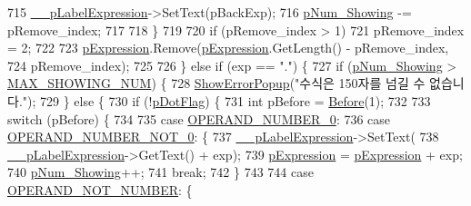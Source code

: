 \begin{DoxyCode}
715                 \hyperlink{class_calculator_form_a85c791f34a8b69e7d22b7d64d7f69bac}{\_\_pLabelExpression}->SetText(pBackExp);
716                 \hyperlink{_calculator_form_8cpp_afab1dc0f42edf6d2d70e1a3b9a23114b}{pNum\_Showing} -= pRemove\_index;
717 
718             \}
719 
720             \textcolor{keywordflow}{if} (pRemove\_index > 1)
721                 pRemove\_index = 2;
722 
723             \hyperlink{_calculator_form_8cpp_a8e641e0c730e6831fcb8e9caf57f5285}{pExpression}.Remove(\hyperlink{_calculator_form_8cpp_a8e641e0c730e6831fcb8e9caf57f5285}{pExpression}.GetLength() - pRemove\_index,
724                     pRemove\_index);
725 
726         \} \textcolor{keywordflow}{else} \textcolor{keywordflow}{if} (exp == \textcolor{stringliteral}{"."}) \{
727             \textcolor{keywordflow}{if} (\hyperlink{_calculator_form_8cpp_afab1dc0f42edf6d2d70e1a3b9a23114b}{pNum\_Showing} > \hyperlink{_calculator_form_8cpp_abece60225b3a6a5859e110ffa820effc}{MAX\_SHOWING\_NUM}) \{
728                 \hyperlink{class_calculator_form_a47822c0c78fff69b9d3ebdb8a5f9a7a4}{ShowErrorPopup}(\textcolor{stringliteral}{"수식은 150자를 넘길 수 없습니다."});
729             \} \textcolor{keywordflow}{else} \{
730                 \textcolor{keywordflow}{if} (!\hyperlink{_calculator_form_8cpp_af728e21ac3463ebc5e7746a542efb32f}{pDotFlag}) \{
731                     \textcolor{keywordtype}{int} pBefore = \hyperlink{class_calculator_form_af8fd474cf2173be9fa0dbbdfc114b5b3}{Before}(1);
732 
733                     \textcolor{keywordflow}{switch} (pBefore) \{
734 
735                     \textcolor{keywordflow}{case} \hyperlink{_calculator_form_8cpp_ace8ca5226379bd4e27e83a4fa65b4730}{OPERAND\_NUMBER\_0}:
736                     \textcolor{keywordflow}{case} \hyperlink{_calculator_form_8cpp_a1f5ddbd63e4020c3e1ab02f2a8a272ea}{OPERAND\_NUMBER\_NOT\_0}: \{
737                         \hyperlink{class_calculator_form_a85c791f34a8b69e7d22b7d64d7f69bac}{\_\_pLabelExpression}->SetText(
738                                 \hyperlink{class_calculator_form_a85c791f34a8b69e7d22b7d64d7f69bac}{\_\_pLabelExpression}->GetText() + exp);
739                         \hyperlink{_calculator_form_8cpp_a8e641e0c730e6831fcb8e9caf57f5285}{pExpression} = \hyperlink{_calculator_form_8cpp_a8e641e0c730e6831fcb8e9caf57f5285}{pExpression} + exp;
740                         \hyperlink{_calculator_form_8cpp_afab1dc0f42edf6d2d70e1a3b9a23114b}{pNum\_Showing}++;
741                         \textcolor{keywordflow}{break};
742                     \}
743 
744                     \textcolor{keywordflow}{case} \hyperlink{_calculator_form_8cpp_a310731b27bb8f16b0f5fdfeae1f7ffb5}{OPERAND\_NOT\_NUMBER}: \{

\end{DoxyCode}
